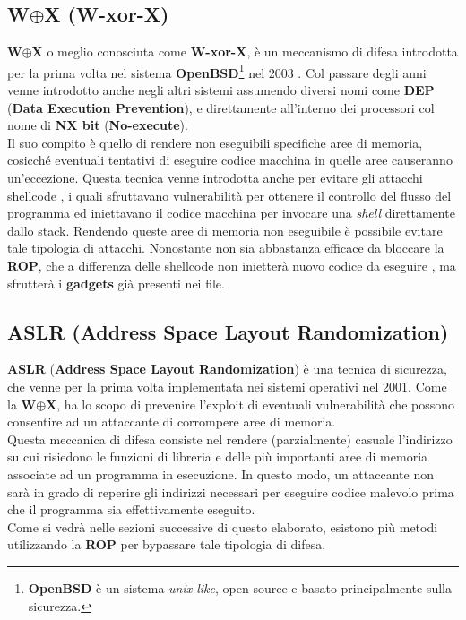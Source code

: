 \subsection{W$\oplus$X (W-xor-X)}
\label{sec:Def-W-xor-X}
\textbf{W$\oplus$X} o meglio conosciuta come \textbf{W-xor-X}, è un meccanismo di difesa introdotta per la prima volta nel sistema \textbf{OpenBSD}\footnote[2]{\textbf{OpenBSD} è un sistema \textit{unix-like}, open-source e basato principalmente sulla sicurezza.} nel 2003 \cite*{OpenBSD-3.3}. Col passare degli anni venne introdotto anche negli altri sistemi 
assumendo diversi nomi come \textbf{DEP} (\textbf{Data Execution Prevention})\cite*{DEP-windows}, e direttamente all'interno dei processori col nome di \textbf{NX bit} (\textbf{No-execute})\cite*{NX}.\\
Il suo compito è quello di rendere non eseguibili specifiche aree di memoria, cosicché eventuali tentativi di eseguire codice macchina in quelle aree causeranno un'eccezione. Questa tecnica venne introdotta anche per evitare gli attacchi shellcode \cite*{shellcode}\cite*{Stack-bufferoverflow}, i quali sfruttavano vulnerabilità per ottenere il controllo del flusso
del programma ed iniettavano il codice macchina per invocare una \textit{shell} direttamente dallo stack. Rendendo queste aree di memoria non eseguibile è possibile evitare tale tipologia di attacchi. Nonostante non sia abbastanza efficace da bloccare la \textbf{ROP}, che a differenza delle shellcode non inietterà nuovo codice da eseguire \cite*{ASLR-WX}, ma sfrutterà i \textbf{gadgets} già presenti nei file.\\

\subsection{ASLR (Address Space Layout Randomization)}
\label{sec:Def-ASLR}
\textbf{ASLR} (\textbf{Address Space Layout Randomization}) \cite*{ASLR}\Cite*{ASLR-WX} è una tecnica di sicurezza, che venne per la prima volta implementata nei sistemi operativi nel 2001. Come la \textbf{W$\oplus$X}, ha lo scopo di prevenire l'exploit di eventuali vulnerabilità che possono consentire ad un attaccante di corrompere aree di memoria.\\
Questa meccanica di difesa consiste nel rendere (parzialmente) casuale l'indirizzo su cui risiedono le funzioni di libreria e delle più importanti aree di memoria associate ad un programma in esecuzione. In questo modo, un attaccante non sarà in grado di reperire gli indirizzi necessari per eseguire codice malevolo prima che il programma sia effettivamente eseguito.\\
Come si vedrà nelle sezioni successive di questo elaborato, esistono più metodi utilizzando la \textbf{ROP} per bypassare tale tipologia di difesa.
